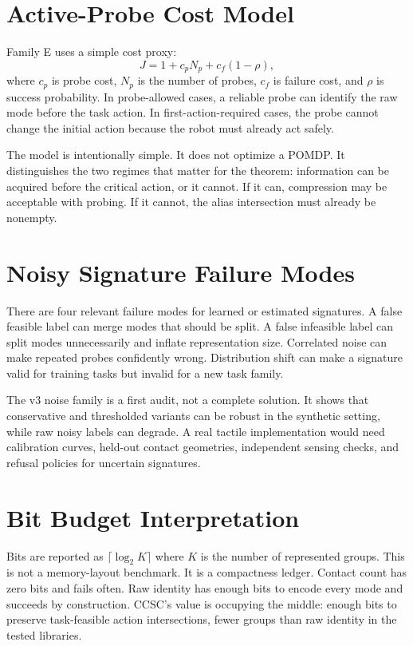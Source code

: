 \documentclass{article}
\begin{document}
\section{Active-Probe Cost Model}
Family E uses a simple cost proxy:
\[
J = 1 + c_p N_p + c_f(1-\rho),
\]
where $c_p$ is probe cost, $N_p$ is the number of probes, $c_f$ is failure cost, and $\rho$ is success probability. In probe-allowed cases, a reliable probe can identify the raw mode before the task action. In first-action-required cases, the probe cannot change the initial action because the robot must already act safely.

The model is intentionally simple. It does not optimize a POMDP. It distinguishes the two regimes that matter for the theorem: information can be acquired before the critical action, or it cannot. If it can, compression may be acceptable with probing. If it cannot, the alias intersection must already be nonempty.

\section{Noisy Signature Failure Modes}
There are four relevant failure modes for learned or estimated signatures. A false feasible label can merge modes that should be split. A false infeasible label can split modes unnecessarily and inflate representation size. Correlated noise can make repeated probes confidently wrong. Distribution shift can make a signature valid for training tasks but invalid for a new task family.

The v3 noise family is a first audit, not a complete solution. It shows that conservative and thresholded variants can be robust in the synthetic setting, while raw noisy labels can degrade. A real tactile implementation would need calibration curves, held-out contact geometries, independent sensing checks, and refusal policies for uncertain signatures.

\section{Bit Budget Interpretation}
Bits are reported as $\lceil\log_2 K\rceil$ where $K$ is the number of represented groups. This is not a memory-layout benchmark. It is a compactness ledger. Contact count has zero bits and fails often. Raw identity has enough bits to encode every mode and succeeds by construction. CCSC's value is occupying the middle: enough bits to preserve task-feasible action intersections, fewer groups than raw identity in the tested libraries.
\end{document}

